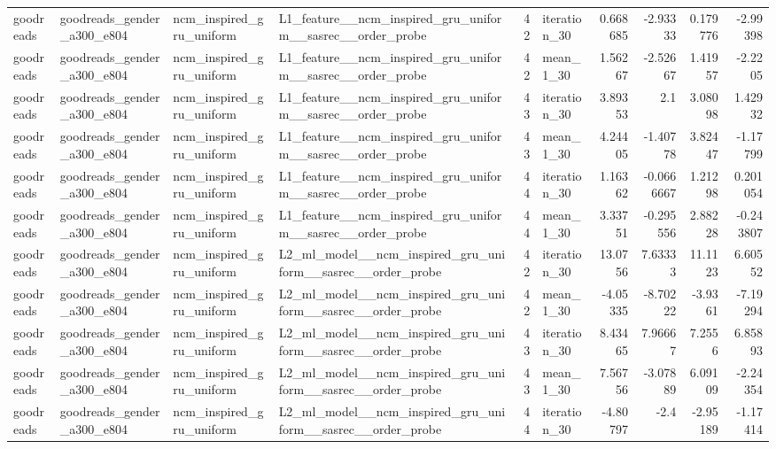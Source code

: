 \begin{table}[htbp!]
\begin{tabular}{llllrlrrrr}
goodreads & goodreads\_gender\_a300\_e804 & ncm\_inspired\_gru\_uniform & L1\_feature\_\_ncm\_inspired\_gru\_uniform\_\_sasrec\_\_order\_probe & 42 & iteration\_30 & 0.668685 & -2.93333 & 0.179776 & -2.99398 \\
goodreads & goodreads\_gender\_a300\_e804 & ncm\_inspired\_gru\_uniform & L1\_feature\_\_ncm\_inspired\_gru\_uniform\_\_sasrec\_\_order\_probe & 42 & mean\_1\_30 & 1.56267 & -2.52667 & 1.41957 & -2.2205 \\
goodreads & goodreads\_gender\_a300\_e804 & ncm\_inspired\_gru\_uniform & L1\_feature\_\_ncm\_inspired\_gru\_uniform\_\_sasrec\_\_order\_probe & 43 & iteration\_30 & 3.89353 & 2.1 & 3.08098 & 1.42932 \\
goodreads & goodreads\_gender\_a300\_e804 & ncm\_inspired\_gru\_uniform & L1\_feature\_\_ncm\_inspired\_gru\_uniform\_\_sasrec\_\_order\_probe & 43 & mean\_1\_30 & 4.24405 & -1.40778 & 3.82447 & -1.17799 \\
goodreads & goodreads\_gender\_a300\_e804 & ncm\_inspired\_gru\_uniform & L1\_feature\_\_ncm\_inspired\_gru\_uniform\_\_sasrec\_\_order\_probe & 44 & iteration\_30 & 1.16362 & -0.0666667 & 1.21298 & 0.201054 \\
goodreads & goodreads\_gender\_a300\_e804 & ncm\_inspired\_gru\_uniform & L1\_feature\_\_ncm\_inspired\_gru\_uniform\_\_sasrec\_\_order\_probe & 44 & mean\_1\_30 & 3.33751 & -0.295556 & 2.88228 & -0.243807 \\
goodreads & goodreads\_gender\_a300\_e804 & ncm\_inspired\_gru\_uniform & L2\_ml\_model\_\_ncm\_inspired\_gru\_uniform\_\_sasrec\_\_order\_probe & 42 & iteration\_30 & 13.0756 & 7.63333 & 11.1123 & 6.60552 \\
goodreads & goodreads\_gender\_a300\_e804 & ncm\_inspired\_gru\_uniform & L2\_ml\_model\_\_ncm\_inspired\_gru\_uniform\_\_sasrec\_\_order\_probe & 42 & mean\_1\_30 & -4.05335 & -8.70222 & -3.9361 & -7.19294 \\
goodreads & goodreads\_gender\_a300\_e804 & ncm\_inspired\_gru\_uniform & L2\_ml\_model\_\_ncm\_inspired\_gru\_uniform\_\_sasrec\_\_order\_probe & 43 & iteration\_30 & 8.43465 & 7.96667 & 7.2556 & 6.85893 \\
goodreads & goodreads\_gender\_a300\_e804 & ncm\_inspired\_gru\_uniform & L2\_ml\_model\_\_ncm\_inspired\_gru\_uniform\_\_sasrec\_\_order\_probe & 43 & mean\_1\_30 & 7.56756 & -3.07889 & 6.09109 & -2.24354 \\
goodreads & goodreads\_gender\_a300\_e804 & ncm\_inspired\_gru\_uniform & L2\_ml\_model\_\_ncm\_inspired\_gru\_uniform\_\_sasrec\_\_order\_probe & 44 & iteration\_30 & -4.80797 & -2.4 & -2.95189 & -1.17414 \\

\end{tabular}
\end{table}
